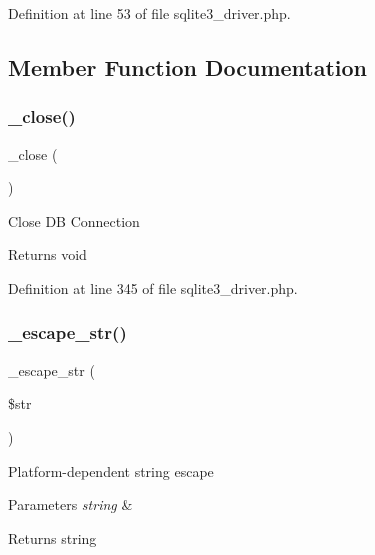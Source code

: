 Definition at line 53 of file sqlite3\+\_\+driver.\+php.



\subsection{Member Function Documentation}
\mbox{\label{class_c_i___d_b__sqlite3__driver_a4d9082658000e5ede8312067c6dda9db}} 
\subsubsection{\texorpdfstring{\_close()}{\_close()}}
{\footnotesize\ttfamily \+\_\+close (\begin{DoxyParamCaption}{ }\end{DoxyParamCaption})\hspace{0.3cm}{\ttfamily [protected]}}

Close DB Connection

\begin{DoxyReturn}{Returns}
void 
\end{DoxyReturn}


Definition at line 345 of file sqlite3\+\_\+driver.\+php.

\mbox{\label{class_c_i___d_b__sqlite3__driver_af8ef0237bfcdb19215b63fff769e7a55}} 
\subsubsection{\texorpdfstring{\_escape\_str()}{\_escape\_str()}}
{\footnotesize\ttfamily \+\_\+escape\+\_\+str (\begin{DoxyParamCaption}\item[{}]{\$str }\end{DoxyParamCaption})\hspace{0.3cm}{\ttfamily [protected]}}

Platform-\/dependent string escape


\begin{DoxyParams}{Parameters}
{\em string} & \\
\hline
\end{DoxyParams}
\begin{DoxyReturn}{Returns}
string 
\end{DoxyReturn}


